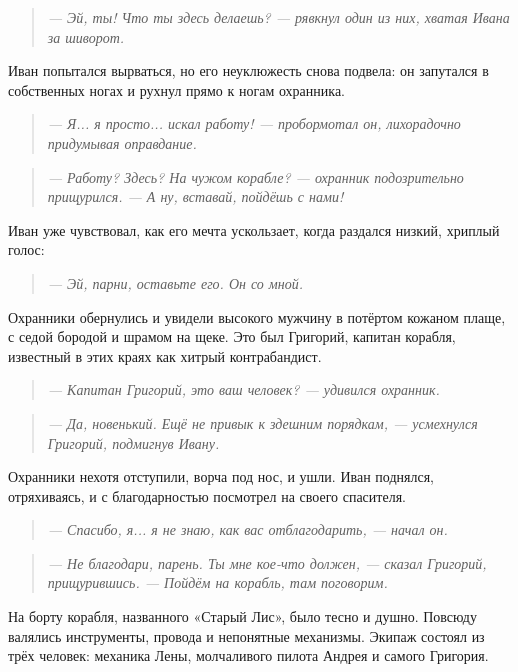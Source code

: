 \documentclass[12pt,a4paper]{book}
\newenvironment{dialogue}{\begin{quote}\itshape}{\end{quote}}
\begin{document}
\begin{dialogue}
--- Эй, ты! Что ты здесь делаешь? --- рявкнул один из них, хватая Ивана за шиворот.
\end{dialogue}

Иван попытался вырваться, но его неуклюжесть снова подвела: он запутался в собственных ногах и рухнул прямо к ногам охранника.

\begin{dialogue}
--- Я... я просто... искал работу! --- пробормотал он, лихорадочно придумывая оправдание.
\end{dialogue}

\begin{dialogue}
--- Работу? Здесь? На чужом корабле? --- охранник подозрительно прищурился. --- А ну, вставай, пойдёшь с нами!
\end{dialogue}

Иван уже чувствовал, как его мечта ускользает, когда раздался низкий, хриплый голос:

\begin{dialogue}
--- Эй, парни, оставьте его. Он со мной.
\end{dialogue}

Охранники обернулись и увидели высокого мужчину в потёртом кожаном плаще, с седой бородой и шрамом на щеке. Это был Григорий, капитан корабля, известный в этих краях как хитрый контрабандист.

\begin{dialogue}
--- Капитан Григорий, это ваш человек? --- удивился охранник.
\end{dialogue}

\begin{dialogue}
--- Да, новенький. Ещё не привык к здешним порядкам, --- усмехнулся Григорий, подмигнув Ивану.
\end{dialogue}

Охранники нехотя отступили, ворча под нос, и ушли. Иван поднялся, отряхиваясь, и с благодарностью посмотрел на своего спасителя.

\begin{dialogue}
--- Спасибо, я... я не знаю, как вас отблагодарить, --- начал он.
\end{dialogue}

\begin{dialogue}
--- Не благодари, парень. Ты мне кое-что должен, --- сказал Григорий, прищурившись. --- Пойдём на корабль, там поговорим.
\end{dialogue}

На борту корабля, названного «Старый Лис», было тесно и душно. Повсюду валялись инструменты, провода и непонятные механизмы. Экипаж состоял из трёх человек: механика Лены, молчаливого пилота Андрея и самого Григория.
\end{document}
